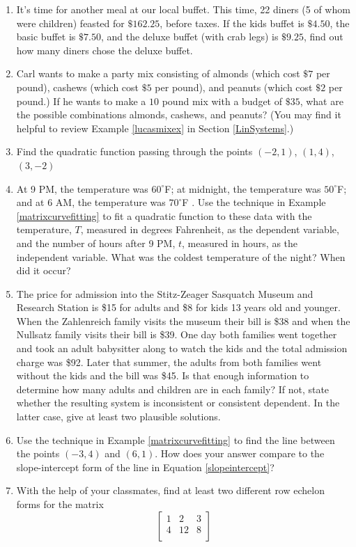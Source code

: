 \begin{enumerate}
\setcounter{enumi}{\value{HW}}

\item  It's time for another meal at our local buffet.  This time, 22 diners (5 of whom were children) feasted for $\$162.25$, before taxes.  If the kids buffet is $\$4.50$, the basic buffet is $\$7.50$, and the deluxe buffet (with crab legs) is $\$9.25$, find out how many diners chose the deluxe buffet. 

\item Carl wants to make a party mix consisting of almonds (which cost $\$7$ per pound), cashews (which cost $\$5$ per pound), and peanuts (which cost $\$2$ per pound.)  If he wants to make a $10$ pound mix with a budget of $\$35$, what are the possible combinations almonds, cashews, and peanuts?  (You may find it helpful to review Example \ref{lucasmixex} in Section \ref{LinSystems}.)


\item  Find the quadratic function passing through the points $(-2,1)$, $(1,4)$, $(3,-2)$

\item  At 9 PM, the temperature was $60^{\circ}$F; at midnight, the temperature was $50^{\circ}$F; and at 6 AM, the temperature was $70^{\circ}$F .  Use the technique in Example \ref{matrixcurvefitting} to fit a quadratic function to these data with the temperature, $T$, measured in degrees Fahrenheit, as the dependent variable, and the number of hours after 9 PM, $t$, measured in hours, as the independent variable. What was the coldest temperature of the night?  When did it occur? 

\item The price for admission into the Stitz-Zeager Sasquatch Museum and Research Station is \$15 for adults and \$8 for kids 13 years old and younger. When the Zahlenreich family visits the museum their bill is \$38 and when the Nullsatz family visits their bill is \$39.  One day both families went together and took an adult babysitter along to watch the kids and the total admission charge was \$92.  Later that summer, the adults from both families went without the kids and the bill was \$45.  Is that enough information to determine how many adults and children are in each family?  If not, state whether the resulting system is inconsistent or consistent dependent.  In the latter case, give at least two plausible solutions.  

\item Use the technique in Example \ref{matrixcurvefitting} to find the line between the points $(-3, 4)$ and $(6, 1)$. How does your answer compare to the slope-intercept form of the line in Equation \ref{slopeintercept}?

\item With the help of your classmates, find at least two different row echelon forms for the matrix \[\left[ \begin{array}{rr|r} 
1 & 2 & 3 \\ 
4 & 12 & 8  \\ 
\end{array} \right]\]

\end{enumerate}

